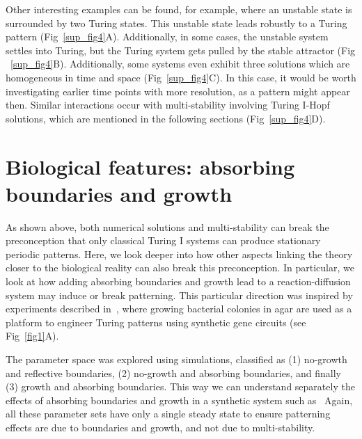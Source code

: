 Other interesting examples can be found, for example, where an unstable state is surrounded by two Turing states. This unstable state leads robustly to a Turing pattern (Fig~\ref{sup_fig4}A).
Additionally, in some cases, the unstable system settles into Turing, but the Turing system gets pulled by the stable attractor (Fig ~\ref{sup_fig4}B). Additionally, some systems even exhibit three solutions which are homogeneous in time and space (Fig~\ref{sup_fig4}C). In this case, it would be worth investigating earlier time points with more resolution, as a pattern might appear then.
Similar interactions occur with multi-stability involving Turing I-Hopf solutions, which are mentioned in the following sections (Fig~\ref{sup_fig4}D).




\section*{Biological features: absorbing boundaries and growth}
As shown above, both numerical solutions and multi-stability can break the preconception that only classical Turing I systems can produce stationary periodic patterns.
Here, we look deeper into how other aspects linking the theory closer to the biological reality can also break this preconception.
In particular, we look at how adding absorbing boundaries and growth lead to a reaction-diffusion system may induce or break patterning.
This particular direction was inspired by experiments described in~\parencite{Oliver2023}, where growing bacterial colonies in agar are used as a platform to engineer Turing patterns using synthetic gene circuits (see Fig~\ref{fig1}A).

The parameter space was explored using simulations, classified as  (1) no-growth and reflective boundaries, (2) no-growth and absorbing boundaries, and finally (3) growth and absorbing boundaries. This way we can understand separately the effects of absorbing boundaries and growth in a synthetic system such as~\cite{Oliver2023}
Again, all these parameter sets have only a single steady state to ensure patterning effects are due to boundaries and growth, and not due to multi-stability.

